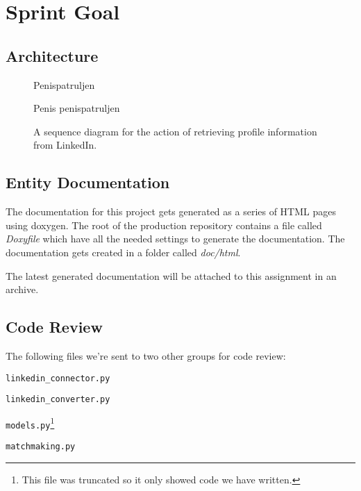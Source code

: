 \section{Sprint Goal}


\subsection{Architecture}
\begin{figure}[h]
    \centering
    \scalebox{1}{}
    \caption{Penispatruljen}
    \label{fig:overview}
\end{figure}

\begin{figure}[h]
    \centering
    \scalebox{1}{}
    \caption{Penis penispatruljen}
    \label{fig:packages}
\end{figure}

\begin{figure}[h]
    \centering
    \scalebox{1}{}
    \caption{A sequence diagram for the action of retrieving profile information from LinkedIn.}
    \label{fig:sequence}
\end{figure}


\subsection{Entity Documentation}

The documentation for this project gets generated as a series of HTML pages
using doxygen. The root of the production repository contains a file called
\textit{Doxyfile} which have all the needed settings to generate the
documentation. The documentation gets created in a folder called
\textit{doc/html}.

The latest generated documentation will be attached to this assignment in an
archive.

\subsection{Code Review}
The following files we're sent to two other groups for code review:
\begin{itemize*}
    \item \texttt{linkedin\_connector.py}
    \item \texttt{linkedin\_converter.py}
    \item \texttt{models.py}\footnote{This file was truncated so it only showed code we have written.}
    \item \texttt{matchmaking.py}
\end{itemize*}

